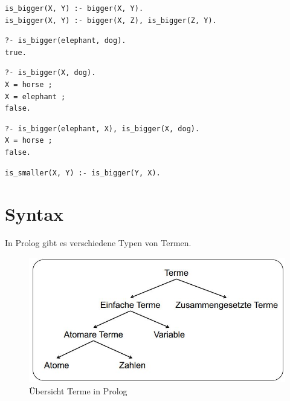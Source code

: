 \begin{lstlisting}[caption=Transitive Hülle von \emph{bigger/2}]
% Wir wissen implizit, dass der Elefant grösser ist als der Hund. Da der Elefant grösser als das Pferd ist und das Pferd grösser als der Hund. Aber eine Anfrage ob der Elefant nun grösser als der Hund ist, würde false liefern. Es müssen Regeln definiert werden, welche diese Beziehung unter den Fakten abbilden. Wir definieren für bigger/2 eine transitive Hülle.
is_bigger(X, Y) :- bigger(X, Y).
is_bigger(X, Y) :- bigger(X, Z), is_bigger(Z, Y).
\end{lstlisting}

\begin{lstlisting}[caption=Transitive Anfrage]
?- is_bigger(elephant, dog).
true.
\end{lstlisting}

\begin{lstlisting}[caption=Transitive Anfrage mit Variabeln]
% Selbstverständlich können nun auch Anfragen mit Variabeln über die transitive Hülle durchgeführt werden.
?- is_bigger(X, dog).
X = horse ;
X = elephant ;
false.
\end{lstlisting}

\begin{lstlisting}[caption=Verknüpfen von Anfragen]
% Es können auch verknüpfte Anfragen (UND) ausgeführt werden.
?- is_bigger(elephant, X), is_bigger(X, dog).
X = horse ;
false.
\end{lstlisting}

\begin{lstlisting}[caption=Regel umkehren]
% Eine is_smaller/2-Regel ist schnell implementiert.
is_smaller(X, Y) :- is_bigger(Y, X).
\end{lstlisting}

\newpage
\section{Syntax}
In Prolog gibt es verschiedene Typen von Termen.

\begin{figure}[h!]
\centering
\includegraphics[width=0.5\linewidth]{fig/prolog-terme}
\caption{Übersicht Terme in Prolog}
\label{fig:prolog-terme}
\end{figure}

